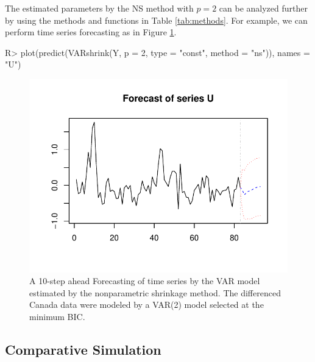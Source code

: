 \documentclass[
]{jss}
\begin{document}
The estimated parameters by the NS method with \(p=2\) can be analyzed
further by using the methods and functions in Table \ref{tab:methods}.
For example, we can perform time series forecasting as in Figure
\ref{fig:pred}.

\begin{CodeChunk}

\begin{CodeInput}
R> plot(predict(VARshrink(Y, p = 2, type = "const", method = "ns")), names = "U")
\end{CodeInput}
\begin{figure}

{\centering \includegraphics{article_jss_varshrink_files/figure-latex/pred-1} 

}

\caption{\label{fig:pred}A 10-step ahead Forecasting of time series by the VAR model estimated by the nonparametric shrinkage method. The differenced Canada data were modeled by a VAR(2) model selected at the minimum BIC.}\label{fig:pred}
\end{figure}
\end{CodeChunk}

\hypertarget{comparative-simulation}{%
\subsection{Comparative Simulation}\label{comparative-simulation}}
\end{document}
